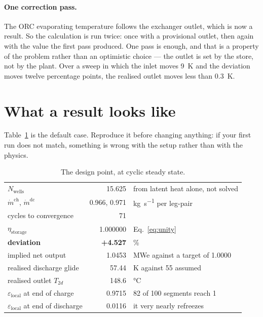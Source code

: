 \documentclass[11pt,a4paper]{article}
\providecommand{\celsius}{\degreeCelsius}
\newcommand{\md}{\ensuremath{\dot m}}
\newcommand{\Nwells}{\ensuremath{N_{\mathrm{wells}}}}
\newcommand{\epsloc}{\ensuremath{\varepsilon_{\mathrm{local}}}}
\begin{document}
\paragraph{One correction pass.}
The ORC evaporating temperature follows the exchanger outlet, which is now a
result. So the calculation is run twice: once with a provisional outlet, then
again with the value the first pass produced. One pass is enough, and that is a
property of the problem rather than an optimistic choice --- the outlet is set by
the store, not by the plant. Over a sweep in which the inlet moves
\SI{9}{\kelvin} and the deviation moves twelve percentage points, the realised
outlet moves less than \SI{0.3}{\kelvin}.

\section{What a result looks like}
\label{sec:result}

Table~\ref{tab:design} is the default case. Reproduce it before changing
anything: if your first run does not match, something is wrong with the setup
rather than with the physics.

\begin{table}[htbp]
\centering
\caption{The design point, at cyclic steady state.}
\label{tab:design}
\begin{tabular}{@{}l r l@{}}
\toprule
$\Nwells$ & 15.625 & from latent heat alone, not solved \\
$\md^{\mathrm{ch}}$, $\md^{\mathrm{dc}}$ & 0.966, 0.971 &
  \si{\kilogram\per\second} per leg-pair \\
cycles to convergence & 71 & \\
$\eta_{\mathrm{storage}}$ & 1.000000 & Eq.~\eqref{eq:unity} \\
\midrule
\textbf{deviation} & \textbf{+4.527} & \si{\percent} \\
implied net output & 1.0453 & MWe against a target of 1.0000 \\
realised discharge glide & 57.44 & \si{\kelvin} against \num{55} assumed \\
realised outlet $T_{2d}$ & 148.6 & \si{\celsius} \\
\midrule
$\epsloc$ at end of charge & 0.9715 & \num{82} of \num{100} segments reach 1 \\
$\epsloc$ at end of discharge & 0.0116 & it very nearly refreezes \\
\bottomrule
\end{tabular}
\end{table}
\end{document}
